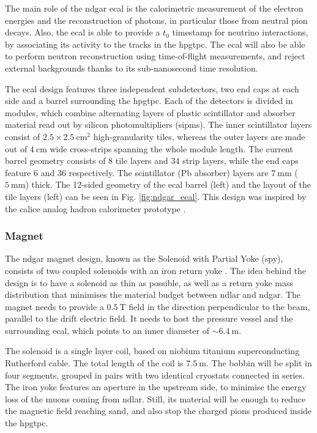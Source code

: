The main role of the \gls{ndgar} \gls{ecal} is the calorimetric measurement of the electron energies and the reconstruction of photons, in particular those from neutral pion decays. Also, the \gls{ecal} is able to provide a $t_{0}$ timestamp for neutrino interactions, by associating its activity to the tracks in the \gls{hpgtpc}. The \gls{ecal} will also be able to perform neutron reconstruction using time-of-flight measurements, and reject external backgrounds thanks to its sub-nanosecond time resolution.

The \gls{ecal} design features three independent subdetectors, two end caps at each side and a barrel surrounding the \gls{hpgtpc}. Each of the detectors is divided in modules, which combine alternating layers of plastic scintillator and absorber material read out by silicon photomultipliers (\gls{sipm}s). The inner scintillator layers consist of $2.5\times2.5~\mathrm{cm}^{2}$ high-granularity tiles, whereas the outer layers are made out of $4~\mathrm{cm}$ wide cross-strips spanning the whole module length. The current barrel geometry consists of 8 tile layers and 34 strip layers, while the end caps feature 6 and 36 respectively. The scintillator (Pb absorber) layers are $7~\mathrm{mm}$ ($5~\mathrm{mm}$) thick. The 12-sided geometry of the \gls{ecal} barrel (left) and the layout of the tile layers (left) can be seen in Fig. \ref{fig:ndgar_ecal}. This design was inspired by the \gls{calice} analog hadron calorimeter prototype \cite{CALICE2010}.

\subsubsection{Magnet}

The \gls{ndgar} magnet design, known as the Solenoid with Partial Yoke (\gls{spy}), consists of two coupled solenoids with an iron return yoke \cite{DUNESPY2023}. The idea behind the design is to have a solenoid as thin as possible, as well as a return yoke mass distribution that minimises the material budget between \gls{ndlar} and \gls{ndgar}. The magnet needs to provide a $0.5~\mathrm{T}$ field in the direction perpendicular to the beam, parallel to the drift electric field. It needs to host the pressure vessel and the surrounding \gls{ecal}, which points to an inner diameter of $\sim6.4~\mathrm{m}$.

The solenoid is a single layer coil, based on niobium titanium superconducting Rutherford cable. The total length of the coil is $7.5~\mathrm{m}$. The bobbin will be split in four segments, grouped in pairs with two identical cryostats connected in series. The iron yoke features an aperture in the upstream side, to minimise the energy loss of the muons coming from \gls{ndlar}. Still, its material will be enough to reduce the magnetic field reaching \gls{sand}, and also stop the charged pions produced inside the \gls{hpgtpc}.

